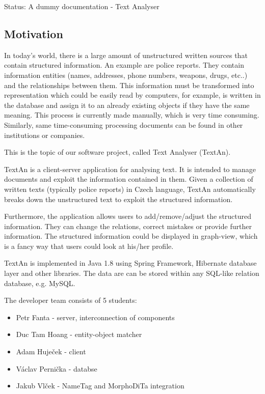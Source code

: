 Status: A dummy documentation - Text Analyser



\subsection{Motivation} In today's world, there is a large amount of unstructured written sources that contain structured information. An example are police reports. They contain information entities (names, addresses, phone numbers, weapons, drugs, etc..) and the relationships between them. This information must be transformed into representation which could be easily read by computers, for example, is written in the database and assign it to an already existing objects if they have the same meaning. This process is currently made manually, which is very time consuming. Similarly, same time-consuming processing documents can be found in other institutions or companies.

This is the topic of our software project, called Text Analyser (TextAn).

TextAn is a client-server application for analysing text.
It is intended to manage documents and exploit the information contained in them.
Given a collection of written texts (typically police reports) in Czech language,
TextAn automatically breaks down the unstructured text to exploit the structured information. 

Furthermore, the application allows users to add/remove/adjust the structured information.
They can change the relations, correct mistakes or provide further information.
The structured information could be displayed in graph-view,
which is a fancy way that users could look at his/her profile. 

TextAn is implemented in Java 1.8 using Spring Framework, Hibernate database layer and other libraries.
The data are can be stored within any SQL-like relation database, e.g. MySQL.

The developer team consists of 5 students:

\begin{itemize}
\itemsep0em
\item Petr Fanta - server, interconnection of components
\item Duc Tam Hoang - entity-object matcher 
\item Adam Huječek - client
\item Václav Pernička - databse
\item Jakub Vlček - NameTag and MorphoDiTa integration
\end{itemize}

